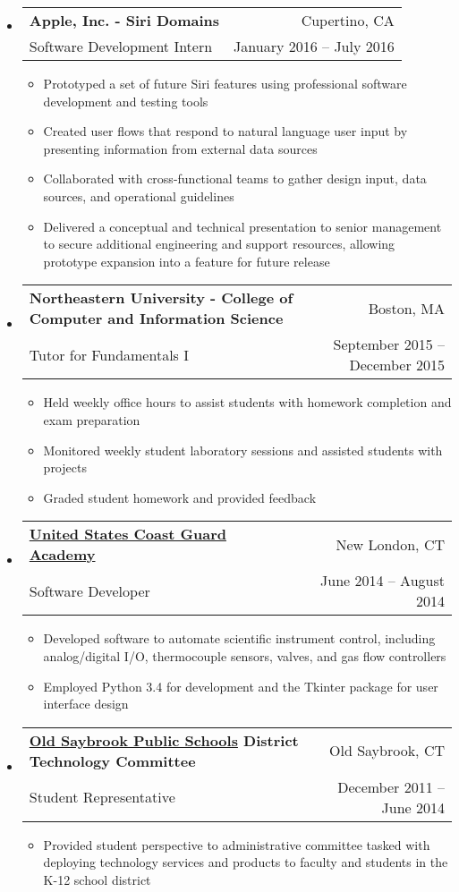 \documentclass[letterpaper,10.6pt]{article}
\makeatletter
\newcommand{\resitem}[1]{\item #1 \vspace{-2pt}}
\newcommand{\ressubheading}[4]{
\begin{tabular*}{6.8in}{l@{\extracolsep{\fill}}r}
		\textbf{#1} & #2 \\
		\small{#3} & \small{#4} \\
\end{tabular*}\vspace{-6pt}}
\makeatother
\begin{document}
	\begin{itemize}[leftmargin=*]
		\item[]
			\ressubheading{Apple, Inc. - \small{Siri Domains}}{Cupertino, CA}{Software Development Intern}{January 2016 -- July 2016}
			{\footnotesize
				\begin{itemize}
					\resitem{Prototyped a set of future Siri features using professional software development and testing tools}
					\resitem{Created user flows
						that respond to natural language user input by presenting information from external data sources}
					\resitem{Collaborated with cross-functional teams to gather design input, data sources, and operational guidelines}
					\resitem{Delivered a conceptual and technical presentation to senior management to secure additional engineering and support resources, allowing prototype expansion into a feature for future release}
				\end{itemize}}
		\item[]
			\ressubheading{Northeastern University - \small{College of Computer and Information Science}}{Boston, MA}{Tutor for Fundamentals I}{September 2015 -- December 2015}
			{\footnotesize
				\begin{itemize}
					\resitem{Held weekly office hours to assist students with homework completion and exam preparation}
					\resitem{Monitored weekly student laboratory sessions and assisted students with projects}
					\resitem{Graded student homework and provided feedback}
				\end{itemize}}
		\item[] 
			\ressubheading{\href{http://www.uscga.edu}{United States Coast Guard Academy}}{New London, CT}
				{Software Developer}{June 2014 -- August 2014}
				{ \footnotesize
				\begin{itemize}
					\resitem{Developed software to automate scientific instrument control, including analog/digital I/O, thermocouple sensors, valves, and gas flow controllers}
					\resitem{Employed Python 3.4 for development and the Tkinter package for user interface design}
				\end{itemize}
				}
		\item[]
			\ressubheading{\href{http://www.oldsaybrookschools.org}{Old Saybrook Public Schools} District Technology Committee}{Old Saybrook, CT}
				{Student Representative}{December 2011 --  June 2014}
				{\footnotesize
				\begin{itemize}
					\resitem{Provided student perspective to administrative committee tasked with deploying technology services and products to faculty and students in the K-12 school district}

\end{itemize}}
\end{itemize}
\end{document}
